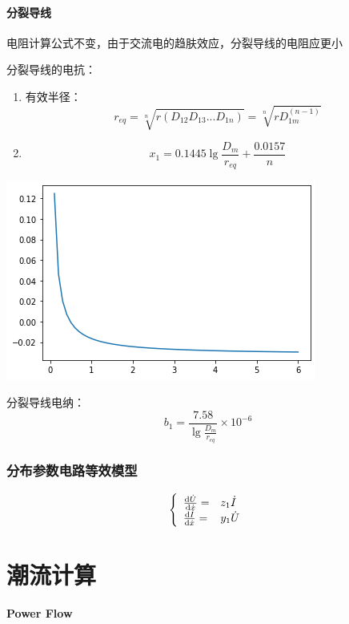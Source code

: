 \documentclass[10pt]{ctexart}
\begin{document}
\subsection{分裂导线}
电阻计算公式不变，由于交流电的趋肤效应，分裂导线的电阻应更小
\begin{definition}
    分裂导线的电抗：

    \begin{enumerate}
        \item 有效半径：$$	r _{eq} =\sqrt[n]{r(D_{12} D_{13} ...D_{1n} )}=\sqrt[n]{rD_{1m} ^{(n-1)} }$$ 
        \item $$ x_{1} =0.1445\lg \frac{D_{m} }{r_{eq} }+\frac{0.0157}{n} $$ 
    \end{enumerate}
\end{definition}
\begin{marginfigure}
        \centering
        \includegraphics[scale=0.4]{figure/1x1n.png}
        \caption{$ x_{1}-n $ }
        \label{x1_n}
\end{marginfigure}
\begin{definition}
    分裂导线电纳：
    $$ b_{1} =\frac{7.58}{\lg  \frac{D_{m} }{r_{eq} }}\times 10^{-6} $$ 
\end{definition}

\section{分布参数电路等效模型}
\begin{equation}
\left\{
\begin{array}{ll}
    \frac{{\rm d}\dot{U}}{{\rm d}\dot{x}}=&z_{1} \dot{I}\\
    \frac{{\rm d}\dot{I}}{{\rm d}\dot{x}}=&y_{1} \dot{U}
\end{array}
\right.
\end{equation}
\newpage
\part{潮流计算}
\textbf{Power Flow}
\end{document}
